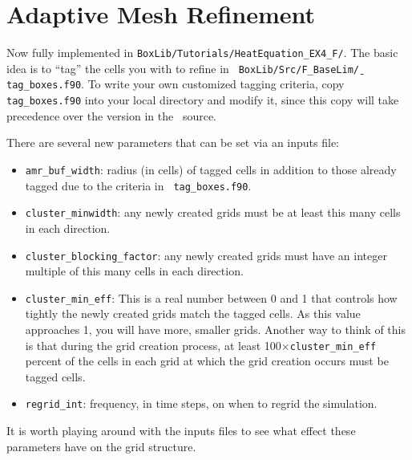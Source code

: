 \section{Adaptive Mesh Refinement}\label{Sec:AMR}
Now fully implemented in {\tt BoxLib/Tutorials/HeatEquation\_EX4\_F/}.
The basic idea is to ``tag'' the cells you with to refine in {\tt
  BoxLib/Src/F\_BaseLim\b/tag\_boxes.f90}.  To write your own
customized tagging criteria, copy {\tt tag\_boxes.f90} into your local
directory and modify it, since this copy will take precedence over the
version in the \BoxLib~source.

There are several new
parameters that can be set via an inputs file:
\begin{itemize}
\item {\tt amr\_buf\_width}: radius (in cells) of tagged cells in
  addition to those already tagged due to the criteria in {\tt
    tag\_boxes.f90}.
\item {\tt cluster\_minwidth}: any newly created grids must be at
  least this many cells in each direction.
\item {\tt cluster\_blocking\_factor}: any newly created grids must
  have an integer multiple of this many cells in each direction.
\item {\tt cluster\_min\_eff}: This is a real number between 0 and 1
  that controls how tightly the newly created grids match the tagged
  cells.  As this value approaches 1, you will have more, smaller
  grids.  Another way to think of this is that during the grid
  creation process, at least 100$\times${\tt cluster\_min\_eff}
  percent of the cells in each grid at which the grid creation occurs
  must be tagged cells.
\item {\tt regrid\_int}: frequency, in time steps, on when to regrid
  the simulation.
\end{itemize}
It is worth playing around with the inputs files to see what effect
these parameters have on the grid structure.

